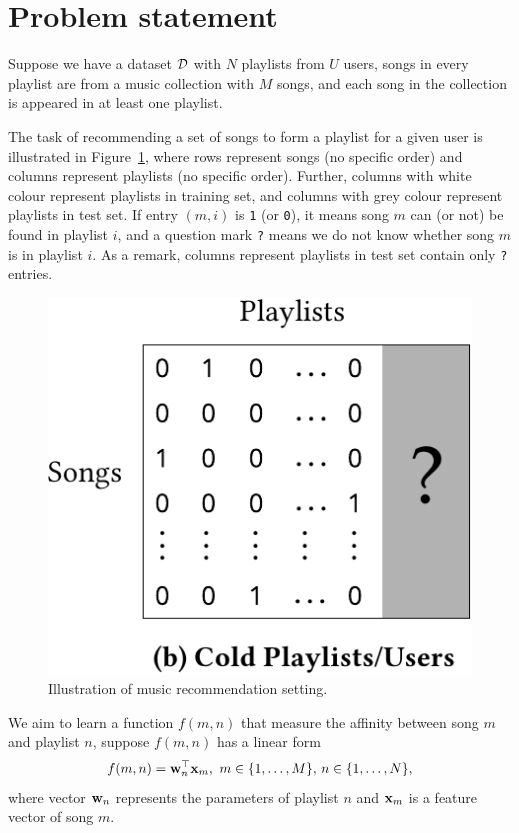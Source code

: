 \section{Problem statement}
\label{sec:problem}


Suppose we have a dataset $\mathcal{D}$ with $N$ playlists from $U$ users, songs in every playlist are from a music collection
with $M$ songs, and each song in the collection is appeared in at least one playlist.

The task of recommending a set of songs to form a playlist for a given user is illustrated in Figure~\ref{fig:gen},
where rows represent songs (no specific order) and columns represent playlists (no specific order).
Further, columns with white colour represent playlists in training set,
and columns with grey colour represent playlists in test set.
If entry $(m, i)$ is \texttt{1} (or \texttt{0}),
it means song $m$ can (or not) be found in playlist $i$,
and a question mark \texttt{?} means we do not know whether song $m$ is in playlist $i$.
As a remark, columns represent playlists in test set contain only \texttt{?} entries.

\begin{figure}[h]
\centering
\includegraphics[width=.5\linewidth]{fig/fig_gen.pdf}
\caption{Illustration of music recommendation setting.}
\label{fig:gen}
\end{figure}






We aim to learn a function $f(m, n)$ that measure the affinity between song $m$ and playlist $n$,
suppose $f(m, n)$ has a linear form
$$
f(m, n) = \mathbf{w}_n^\top \mathbf{x}_m, \ m \in \{1,\dots,M\}, \, n \in \{1,\dots,N\},
$$
where vector $\mathbf{w}_n$ represents the parameters of playlist $n$ and $\mathbf{x}_m$ is a feature vector of song $m$.


